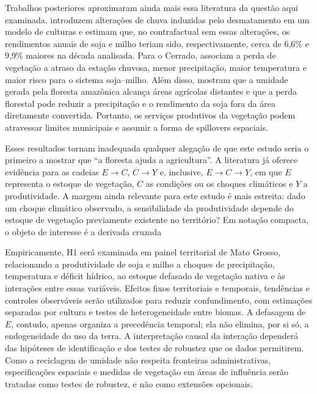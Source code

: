 Trabalhos posteriores aproximaram ainda mais essa literatura da questão aqui examinada. \cite{batista2023deforestation} introduzem alterações de chuva induzidas pelo desmatamento em um modelo de culturas e estimam que, no contrafactual sem essas alterações, os rendimentos anuais de soja e milho teriam sido, respectivamente, cerca de 6,6\% e 9,9\% maiores na década analisada. Para o Cerrado, \cite{leitefilho2025intensification} associam a perda de vegetação a atraso da estação chuvosa, menor precipitação, maior temperatura e maior risco para o sistema soja--milho. Além disso, \cite{li2026amazon} mostram que a umidade gerada pela floresta amazônica alcança áreas agrícolas distantes e que a perda florestal pode reduzir a precipitação e o rendimento da soja fora da área diretamente convertida. Portanto, os serviços produtivos da vegetação podem atravessar limites municipais e assumir a forma de spillovers espaciais.

Esses resultados tornam inadequada qualquer alegação de que este estudo seria o primeiro a mostrar que ``a floresta ajuda a agricultura''. A literatura já oferece evidência para as cadeias $E\rightarrow C$, $C\rightarrow Y$ e, inclusive, $E\rightarrow C\rightarrow Y$, em que $E$ representa o estoque de vegetação, $C$ as condições ou os choques climáticos e $Y$ a produtividade. A margem ainda relevante para este estudo é mais estreita: dado um choque climático observado, a sensibilidade da produtividade depende do estoque de vegetação previamente existente no território? Em notação compacta, o objeto de interesse é a derivada cruzada


Empiricamente, H1 será examinada em painel territorial de Mato Grosso, relacionando a produtividade de soja e milho a choques de precipitação, temperatura e déficit hídrico, ao estoque defasado de vegetação nativa e às interações entre essas variáveis. Efeitos fixos territoriais e temporais, tendências e controles observáveis serão utilizados para reduzir confundimento, com estimações separadas por cultura e testes de heterogeneidade entre biomas. A defasagem de $E$, contudo, apenas organiza a precedência temporal; ela não elimina, por si só, a endogeneidade do uso da terra. A interpretação causal da interação dependerá das hipóteses de identificação e dos testes de robustez que os dados permitirem. Como a reciclagem de umidade não respeita fronteiras administrativas, especificações espaciais e medidas de vegetação em áreas de influência serão tratadas como testes de robustez, e não como extensões opcionais.



